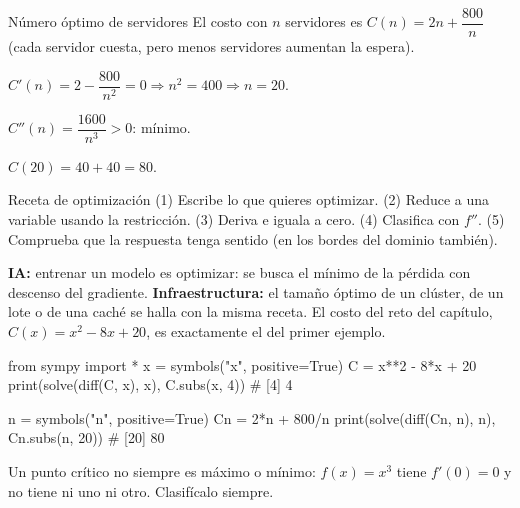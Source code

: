 \begin{tmejemplo}{N\'umero \'optimo de servidores}
El costo con $n$ servidores es $C(n)=2n+\dfrac{800}{n}$ (cada servidor cuesta, pero menos servidores aumentan la espera).
\begin{tmpasos}
\item $C'(n)=2-\dfrac{800}{n^2}=0\Rightarrow n^2=400\Rightarrow n=20$.
\item $C''(n)=\dfrac{1600}{n^3}>0$: m\'inimo.
\item $C(20)=40+40=80$.
\end{tmpasos}
\end{tmejemplo}

\begin{tmdef}{Receta de optimizaci\'on}
(1) Escribe lo que quieres optimizar. (2) Reduce a una variable usando la restricci\'on. (3) Deriva e iguala a cero. (4) Clasifica con $f''$. (5) Comprueba que la respuesta tenga sentido (en los bordes del dominio tambi\'en).
\end{tmdef}

\begin{tmsistemas}
\textbf{IA:} entrenar un modelo es optimizar: se busca el m\'inimo de la p\'erdida con descenso del gradiente. \textbf{Infraestructura:} el tama\~no \'optimo de un cl\'uster, de un lote o de una cach\'e se halla con la misma receta. El costo del reto del cap\'itulo, $C(x)=x^2-8x+20$, es exactamente el del primer ejemplo.
\end{tmsistemas}

\begin{tmcodigo}
from sympy import *
x = symbols("x", positive=True)
C = x**2 - 8*x + 20
print(solve(diff(C, x), x), C.subs(x, 4))     # [4] 4

n = symbols("n", positive=True)
Cn = 2*n + 800/n
print(solve(diff(Cn, n), n), Cn.subs(n, 20))  # [20] 80
\end{tmcodigo}

\begin{tmcuidado}Un punto cr\'itico no siempre es m\'aximo o m\'inimo: $f(x)=x^3$ tiene $f'(0)=0$ y no tiene ni uno ni otro. Clasif\'icalo siempre.\end{tmcuidado}

